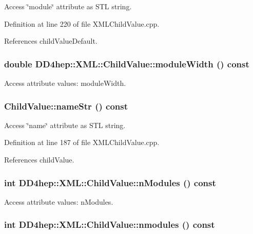Access \char`\"{}module\char`\"{} attribute as STL string. 

Definition at line 220 of file XMLChildValue.cpp.

References childValueDefault.\hypertarget{struct_d_d4hep_1_1_x_m_l_1_1_child_value_a2ee08d0162fff1ea65ec7b81885758bf}{
\subsubsection[{moduleWidth}]{\setlength{\rightskip}{0pt plus 5cm}double DD4hep::XML::ChildValue::moduleWidth () const}}
\label{struct_d_d4hep_1_1_x_m_l_1_1_child_value_a2ee08d0162fff1ea65ec7b81885758bf}


Access attribute values: moduleWidth. \hypertarget{struct_d_d4hep_1_1_x_m_l_1_1_child_value_a67aa53d0e2844326d235d213f1a5c266}{
\subsubsection[{nameStr}]{ ChildValue::nameStr () const}}
\label{struct_d_d4hep_1_1_x_m_l_1_1_child_value_a67aa53d0e2844326d235d213f1a5c266}


Access \char`\"{}name\char`\"{} attribute as STL string. 

Definition at line 187 of file XMLChildValue.cpp.

References childValue.\hypertarget{struct_d_d4hep_1_1_x_m_l_1_1_child_value_a7cf1ade5a453e27222fe31cf8872df3e}{
\subsubsection[{nModules}]{\setlength{\rightskip}{0pt plus 5cm}int DD4hep::XML::ChildValue::nModules () const}}
\label{struct_d_d4hep_1_1_x_m_l_1_1_child_value_a7cf1ade5a453e27222fe31cf8872df3e}


Access attribute values: nModules. \hypertarget{struct_d_d4hep_1_1_x_m_l_1_1_child_value_abc8cdb6358a8b287a82024f9e7b3e798}{
\subsubsection[{nmodules}]{\setlength{\rightskip}{0pt plus 5cm}int DD4hep::XML::ChildValue::nmodules () const}}
\label{struct_d_d4hep_1_1_x_m_l_1_1_child_value_abc8cdb6358a8b287a82024f9e7b3e798}


